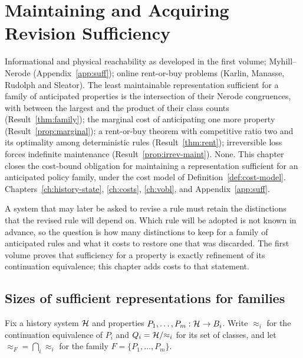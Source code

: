 \chapter{Maintaining and Acquiring Revision Sufficiency}\label{ch:suffcost}
{Informational and physical reachability as developed in the first volume; Myhill--Nerode (Appendix~\ref{app:suff}); online rent-or-buy problems (Karlin, Manasse, Rudolph and Sleator).}
{The least maintainable representation sufficient for a family of anticipated properties is the intersection of their Nerode congruences, with between the largest and the product of their class counts (Result~\ref{thm:family}); the marginal cost of anticipating one more property (Result~\ref{prop:marginal}); a rent-or-buy theorem with competitive ratio two and its optimality among deterministic rules (Result~\ref{thm:rent}); irreversible loss forces indefinite maintenance (Result~\ref{prop:irrev-maint}).}
{None. This chapter closes the cost-bound obligation for maintaining a representation sufficient for an anticipated policy family, under the cost model of Definition~\ref{def:cost-model}.}
{Chapters~\ref{ch:history-state}, \ref{ch:costs}, \ref{ch:vobl}, and Appendix~\ref{app:suff}.}

A system that may later be asked to revise a rule must retain the distinctions that the revised rule will depend on. Which rule will be adopted is not known in advance, so the question is how many distinctions to keep for a family of anticipated rules and what it costs to restore one that was discarded. The first volume proves that sufficiency for a property is exactly refinement of its continuation equivalence; this chapter adds costs to that statement.

\section{Sizes of sufficient representations for families}

Fix a history system $\mathcal{H}$ and properties $P_1,\dots,P_m:\mathcal{H}\to B_i$. Write $\approx_i$ for the continuation equivalence of $P_i$ and $Q_i=\mathcal{H}/{\approx_i}$ for its set of classes, and let $\approx_F=\bigcap_i\approx_i$ for the family $F=\{P_1,\dots,P_m\}$.

